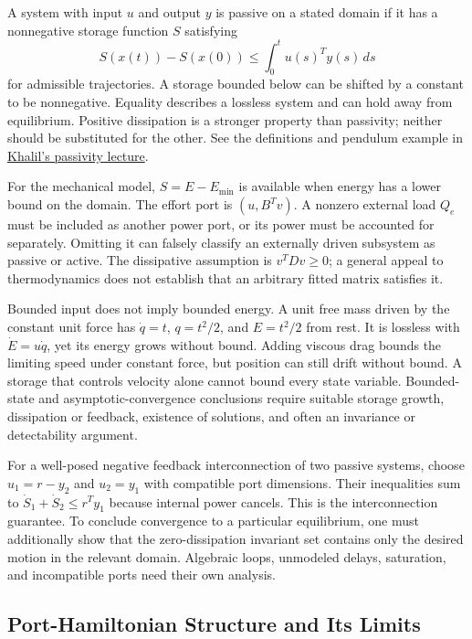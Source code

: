 A system with input $u$ and output $y$ is passive on a stated domain if it has a nonnegative storage function $S$ satisfying
\begin{equation}
S(x(t))-S(x(0))\le\int_0^t u(s)^Ty(s)\,ds
\label{eq:ch3:passivity}
\end{equation}
for admissible trajectories. A storage bounded below can be shifted by a constant to be nonnegative. Equality describes a lossless system and can hold away from equilibrium. Positive dissipation is a stronger property than passivity; neither should be substituted for the other. See the definitions and pendulum example in \href{https://www.egr.msu.edu/~khalil/NonlinearControl/Slides-Full/Lect_12.pdf}{Khalil's passivity lecture}.

For the mechanical model, $S=E-E_{\min}$ is available when energy has a lower bound on the domain. The effort port is $(u,B^Tv)$. A nonzero external load $Q_e$ must be included as another power port, or its power must be accounted for separately. Omitting it can falsely classify an externally driven subsystem as passive or active. The dissipative assumption is $v^TDv\ge0$; a general appeal to thermodynamics does not establish that an arbitrary fitted matrix satisfies it.

Bounded input does not imply bounded energy. A unit free mass driven by the constant unit force has $\dot q=t$, $q=t^2/2$, and $E=t^2/2$ from rest. It is lossless with $\dot E=u\dot q$, yet its energy grows without bound. Adding viscous drag bounds the limiting speed under constant force, but position can still drift without bound. A storage that controls velocity alone cannot bound every state variable. Bounded-state and asymptotic-convergence conclusions require suitable storage growth, dissipation or feedback, existence of solutions, and often an invariance or detectability argument.

For a well-posed negative feedback interconnection of two passive systems, choose $u_1=r-y_2$ and $u_2=y_1$ with compatible port dimensions. Their inequalities sum to $\dot S_1+\dot S_2\le r^Ty_1$ because internal power cancels. This is the interconnection guarantee. To conclude convergence to a particular equilibrium, one must additionally show that the zero-dissipation invariant set contains only the desired motion in the relevant domain. Algebraic loops, unmodeled delays, saturation, and incompatible ports need their own analysis.

\subsection{Port-Hamiltonian Structure and Its Limits}

